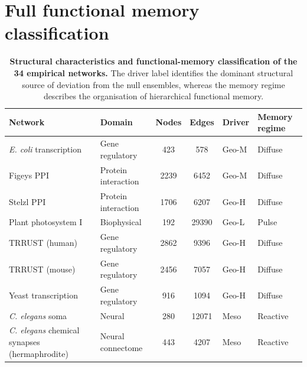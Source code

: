 \documentclass[aps,superscriptaddress,11pt]{revtex4-2}
\theoremstyle{definition}
\theoremstyle{plain}
\begin{document}
\section{Full functional memory classification}

\begin{table}[!ht]
\centering
\scriptsize
\setlength{\tabcolsep}{3.5pt}
\renewcommand{\arraystretch}{0.96}
\caption{\textbf{Structural characteristics and functional-memory 
classification of the 34 empirical networks.}
The driver label identifies the dominant structural source of 
deviation from the null ensembles, whereas the memory regime 
describes the organisation of hierarchical functional memory.}
\label{tab:network_driver_regime_classification}
\begin{tabular}{llccll} %
\toprule
\textbf{Network} &
\textbf{Domain} &
{\textbf{Nodes}} &
{\textbf{Edges}} &
\textbf{Driver} &
\textbf{Memory regime} \\
\midrule

\textit{E. coli} transcription~\cite{ShenOrr2002} &
Gene regulatory & 423 & 578 & Geo-M & Diffuse \\

Figeys PPI~\cite{Ewing2007} &
Protein interaction & 2239 & 6452 & Geo-M & Diffuse \\

Stelzl PPI~\cite{Stelzl2005} &
Protein interaction & 1706 & 6207 & Geo-H & Diffuse \\

Plant photosystem I~\cite{Montepietra2020} &
Biophysical & 192 & 29390 & Geo-L & Pulse \\

TRRUST (human)~\cite{Han2015} &
Gene regulatory & 2862 & 9396 & Geo-H & Diffuse \\

TRRUST (mouse)~\cite{Han2015} &
Gene regulatory & 2456 & 7057 & Geo-H & Diffuse \\

Yeast transcription~\cite{Milo2002} &
Gene regulatory &  916 & 1094 & Geo-H & Diffuse \\

\addlinespace[2pt]
\textit{C. elegans} soma~\cite{Moutuou2025b} &
Neural & 280 & 12071 & Meso & Reactive \\

\textit{C. elegans} chemical synapses (hermaphrodite)~\cite{Cook2019} &
Neural connectome & 443 & 4207 & Meso & Reactive \\


\end{tabular}
\end{table}
\end{document}
